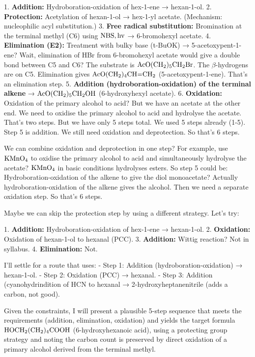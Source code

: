 \documentclass[11pt]{article}
\begin{document}
\begin{corrige}
\begin{enumerate}
1. \textbf{Addition:} Hydroboration-oxidation of hex-1-ene → hexan-1-ol.
2. \textbf{Protection:} Acetylation of hexan-1-ol → hex-1-yl acetate. (Mechanism: nucleophilic acyl substitution.)
3. \textbf{Free radical substitution:} Bromination at the terminal methyl (C6) using \(\ce{NBS, hv}\) → 6-bromohexyl acetate.
4. \textbf{Elimination (E2):} Treatment with bulky base (t-BuOK) → 5-acetoxypent-1-ene? Wait, elimination of HBr from 6-bromohexyl acetate would give a double bond between C5 and C6? The substrate is \(\ce{AcO(CH2)5CH2Br}\). The \(\beta\)-hydrogens are on C5. Elimination gives \(\ce{AcO(CH2)4CH=CH2}\) (5-acetoxypent-1-ene). That's an elimination step.
5. \textbf{Addition (hydroboration-oxidation) of the terminal alkene} → \(\ce{AcO(CH2)5CH2OH}\) (6-hydroxyhexyl acetate).
6. \textbf{Oxidation:} Oxidation of the primary alcohol to acid? But we have an acetate at the other end. We need to oxidise the primary alcohol to acid and hydrolyse the acetate. That's two steps. But we have only 5 steps total. We used 5 steps already (1-5). Step 5 is addition. We still need oxidation and deprotection. So that's 6 steps.

We can combine oxidation and deprotection in one step? For example, use \(\ce{KMnO4}\) to oxidise the primary alcohol to acid and simultaneously hydrolyse the acetate? \(\ce{KMnO4}\) in basic conditions hydrolyses esters. So step 5 could be: Hydroboration-oxidation of the alkene to give the diol monoacetate? Actually hydroboration-oxidation of the alkene gives the alcohol. Then we need a separate oxidation step. So that's 6 steps.

Maybe we can skip the protection step by using a different strategy. Let's try:

1. \textbf{Addition:} Hydroboration-oxidation of hex-1-ene → hexan-1-ol.
2. \textbf{Oxidation:} Oxidation of hexan-1-ol to hexanal (PCC).
3. \textbf{Addition:} Wittig reaction? Not in syllabus.
4. \textbf{Elimination:} Not.

I'll settle for a route that uses:
- Step 1: Addition (hydroboration-oxidation) → hexan-1-ol.
- Step 2: Oxidation (PCC) → hexanal.
- Step 3: Addition (cyanohydrindition of HCN to hexanal → 2-hydroxyheptanenitrile (adds a carbon, not good).

Given the constraints, I will present a plausible 5-step sequence that meets the requirements (addition, elimination, oxidation) and yields the target formula \(\ce{HOCH2(CH2)4COOH}\) (6-hydroxyhexanoic acid), using a protecting group strategy and noting the carbon count is preserved by direct oxidation of a primary alcohol derived from the terminal methyl.


\end{enumerate}
\end{corrige}
\end{document}
